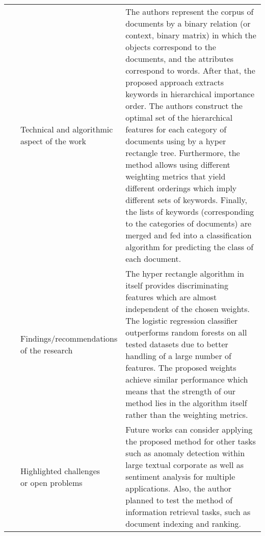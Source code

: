 \begin{landscape}
\begin{longtable}{lp{}p{}}
	\multirow{3}[0]{*}{~\citep{Hassaine2017}} & 
    \specialcell{Technical and algorithmic \\ aspect of the work} &
    The authors represent the corpus of documents by a binary relation (or context, binary matrix) in which the objects correspond to the documents, and the attributes correspond to words. After that, the proposed approach extracts keywords in hierarchical importance order. The authors construct the optimal set of the hierarchical features for each category of documents using by a hyper rectangle tree. Furthermore, the method allows using different weighting metrics that yield different orderings which imply different sets of keywords. Finally, the lists of keywords (corresponding to the categories of documents) are merged and fed into a classification algorithm for predicting the class of each document.  
    \\ & 
    \specialcell{Findings/recommendations \\ of the research} & 
    The hyper rectangle algorithm in itself provides discriminating features which are almost independent of the chosen weights. The logistic regression classifier outperforms random forests on all tested datasets due to better handling of a large number of features. The proposed weights achieve similar performance which means that the strength of our method lies in the algorithm itself rather than the weighting metrics.
    \\ & 
    \specialcell{Highlighted challenges \\ or open problems} & 
    Future works can consider applying the proposed method for other tasks such as anomaly detection within large textual corporate as well as sentiment analysis for multiple applications. Also, the author planned to test the method of information retrieval tasks, such as document indexing and ranking.
	\\
	

\end{longtable}
\end{landscape}
